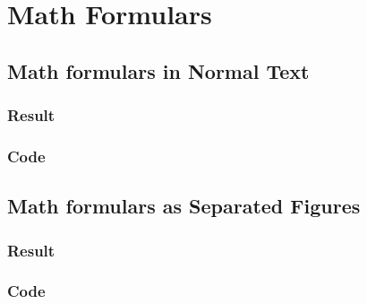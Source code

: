 \newcommand\example[2]{\subsection{#1}\subsubsection{Result}\subsubsection{Code}}
\section{Math Formulars}
\example{Math formulars in Normal Text}{simple_inline.tex}
\example{Math formulars as Separated Figures}{simple_figure.tex}
